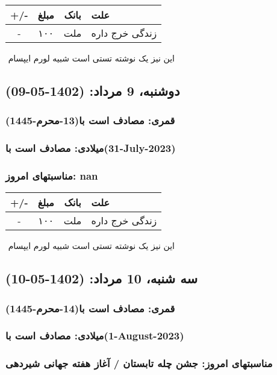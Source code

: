 \documentclass{article}
\newcommand{\rnote}[1]{\marginpar{\textcolor{color}{\StrSubstitute{\##1}{ }{\_}}}}
\newcommand{\myRow}[4]{
    #1 & #2 & #3 & #4 \\ \hline
}
\begin{document}
\begin{tabular}{ | c | c | c | p{5cm} |}
    \hline
    \myRow{ +/- }{مبلغ}{بانک}{علت}
    \myRow{-}{۱۰۰}{ملت}{زندگی خرج داره}
\end{tabular}
\newline
\newline

‌
\rnote{تست}
این نیز یک نوشته تستی است شبیه لورم ایپسام




\newpage
{}
\textcolor{color}{
\section{ دوشنبه، 9 مرداد: (1402-05-09) }
\subsubsection*{قمری: مصادف است با(13-محرم-1445)} 
\subsubsection*{میلادی: مصادف است با(31-July-2023)}
\subsubsection*{مناسبتهای امروز: nan}
}


\begin{tabular}{ | c | c | c | p{5cm} |}
    \hline
    \myRow{ +/- }{مبلغ}{بانک}{علت}
    \myRow{-}{۱۰۰}{ملت}{زندگی خرج داره}
\end{tabular}
\newline
\newline

‌
\rnote{تست}
این نیز یک نوشته تستی است شبیه لورم ایپسام




\newpage
{}
\textcolor{color}{
\section{ سه شنبه، 10 مرداد: (1402-05-10) }
\subsubsection*{قمری: مصادف است با(14-محرم-1445)} 
\subsubsection*{میلادی: مصادف است با(1-August-2023)}
\subsubsection*{مناسبتهای امروز: جشن چله تابستان / آغاز هفته جهانی شیردهی}
}
\end{document}
